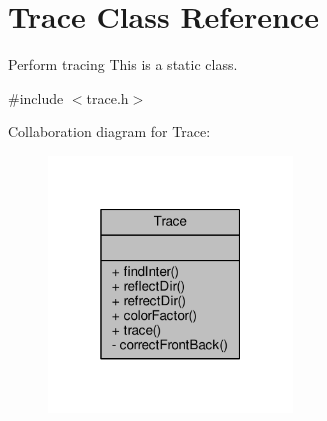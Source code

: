 \hypertarget{classTrace}{}\section{Trace Class Reference}
\label{classTrace}


Perform tracing This is a static class.  




{\ttfamily \#include $<$trace.\+h$>$}



Collaboration diagram for Trace\+:
\nopagebreak
\begin{figure}[H]
\begin{center}
\leavevmode
\includegraphics[width=184pt]{classTrace__coll__graph}
\end{center}
\end{figure}
